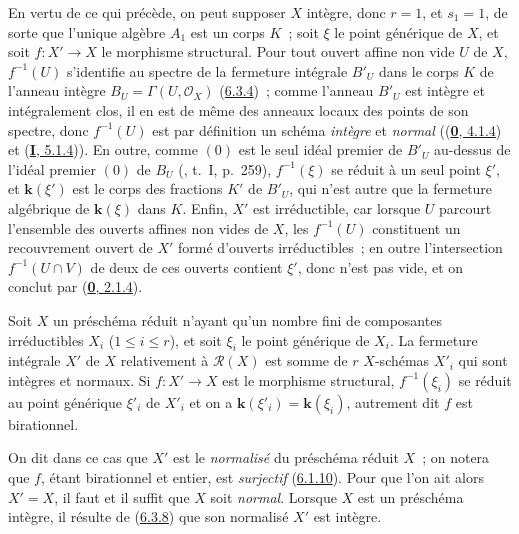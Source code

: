 En vertu de ce qui précède, on peut supposer $X$ intègre, donc $r=1$, et
$s_1=1$, de sorte que l'unique algèbre $A_1$ est un corps $K$~; soit $\xi$ le
point générique de $X$, et soit $f:X'\to X$ le morphisme structural. Pour tout
ouvert affine non vide $U$ de $X$, $f^{-1}(U)$ s'identifie au spectre de la
fermeture intégrale $B'_U$ dans le corps $K$ de l'anneau intègre
$B_U=\Gamma(U,\mathcal{O}_X)$ (\hyperref[II.6.3.4-fr]{6.3.4})~; comme l'anneau
$B'_U$ est intègre et intégralement clos, il en est de même des anneaux locaux
des points de son spectre, donc $f^{-1}(U)$ est par définition un schéma
\emph{intègre} et \emph{normal} ((\hyperref[0.4.1.4-fr]{\textbf{0}, 4.1.4}) et
(\hyperref[I.5.1.4-fr]{\textbf{I}, 5.1.4})). En outre, comme $(0)$ est le seul idéal
premier de $B'_U$ au-dessus de l'idéal premier $(0)$ de $B_U$
(\cite{I-13}, t.~I, p.~259), $f^{-1}(\xi)$ se réduit à un seul point $\xi'$,
et $\boldsymbol{k}(\xi')$ est le corps des fractions $K'$ de $B'_U$, qui n'est autre que la
fermeture algébrique de $\boldsymbol{k}(\xi)$ dans $K$. Enfin, $X'$ est irréductible, car
lorsque $U$ parcourt l'ensemble des ouverts affines non vides de $X$, les
$f^{-1}(U)$ constituent un recouvrement ouvert de $X'$ formé d'ouverts
irréductibles~; en outre l'intersection $f^{-1}(U\cap V)$ de deux de ces
ouverts contient $\xi'$, donc n'est pas vide, et on conclut par
(\hyperref[0.2.1.4-fr]{\textbf{0}, 2.1.4}).

\begin{corollary}[6.3.8]
\label{II.6.3.8-fr}
Soit $X$ un préschéma réduit n'ayant qu'un nombre fini de composantes
irréductibles $X_i$ ($1\leq i\leq r$), et soit $\xi_i$ le point générique de
$X_i$. La fermeture intégrale $X'$ de $X$ relativement à $\mathcal{R}(X)$ est
somme de $r$ $X$-schémas $X'_i$ qui sont intègres et normaux. Si $f:X'\to X$
est le morphisme structural, $f^{-1}(\xi_i)$ se réduit au point générique
$\xi'_i$ de $X'_i$ et on a $\boldsymbol{k}(\xi'_i)=\boldsymbol{k}(\xi_i)$, autrement dit $f$ est
birationnel.
\end{corollary}

On dit dans ce cas que $X'$ est le \emph{normalisé} du préschéma réduit $X$~;
on notera que $f$, étant birationnel et entier, est \emph{surjectif}
(\hyperref[II.6.1.10-fr]{6.1.10}). Pour que l'on ait alors $X'=X$, il faut et
il suffit que $X$ soit \emph{normal}. Lorsque $X$ est un préschéma intègre, il résulte
de (\hyperref[II.6.3.8-fr]{6.3.8}) que son normalisé $X'$ est intègre.

